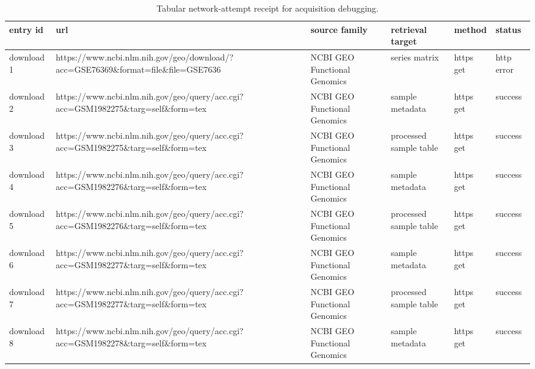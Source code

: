 \documentclass[11pt]{article}
\begin{document}
\begin{table}[tbp]
\centering
\small
\caption{Tabular network-attempt receipt for acquisition debugging.}
\label{tab:network-attempts}
\begin{tabularx}{\linewidth}{>{\raggedright\arraybackslash}X>{\raggedright\arraybackslash}X>{\raggedright\arraybackslash}X>{\raggedright\arraybackslash}X>{\raggedright\arraybackslash}X>{\raggedright\arraybackslash}X}
\toprule
entry id & url & source family & retrieval target & method & status \\
\midrule
download 1 & https://www.ncbi.nlm.nih.gov/geo/download/?acc=GSE76369\&format=file\&file=GSE7636 & NCBI GEO Functional Genomics & series matrix & https get & http error \\
download 2 & https://www.ncbi.nlm.nih.gov/geo/query/acc.cgi?acc=GSM1982275\&targ=self\&form=tex & NCBI GEO Functional Genomics & sample metadata & https get & success \\
download 3 & https://www.ncbi.nlm.nih.gov/geo/query/acc.cgi?acc=GSM1982275\&targ=self\&form=tex & NCBI GEO Functional Genomics & processed sample table & https get & success \\
download 4 & https://www.ncbi.nlm.nih.gov/geo/query/acc.cgi?acc=GSM1982276\&targ=self\&form=tex & NCBI GEO Functional Genomics & sample metadata & https get & success \\
download 5 & https://www.ncbi.nlm.nih.gov/geo/query/acc.cgi?acc=GSM1982276\&targ=self\&form=tex & NCBI GEO Functional Genomics & processed sample table & https get & success \\
download 6 & https://www.ncbi.nlm.nih.gov/geo/query/acc.cgi?acc=GSM1982277\&targ=self\&form=tex & NCBI GEO Functional Genomics & sample metadata & https get & success \\
download 7 & https://www.ncbi.nlm.nih.gov/geo/query/acc.cgi?acc=GSM1982277\&targ=self\&form=tex & NCBI GEO Functional Genomics & processed sample table & https get & success \\
download 8 & https://www.ncbi.nlm.nih.gov/geo/query/acc.cgi?acc=GSM1982278\&targ=self\&form=tex & NCBI GEO Functional Genomics & sample metadata & https get & success \\
\bottomrule
\end{tabularx}
\end{table}
\end{document}
